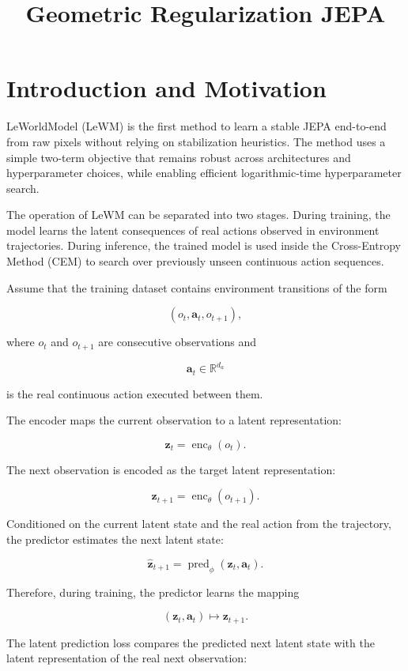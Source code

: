 ﻿\documentclass{article}
\title{Geometric Regularization JEPA}
\begin{document}
\maketitle

\section{Introduction and Motivation}

LeWorldModel (LeWM) is the first method to learn a stable JEPA
end-to-end from raw pixels without relying on stabilization heuristics.
The method uses a simple two-term objective that remains robust across
architectures and hyperparameter choices, while enabling efficient
logarithmic-time hyperparameter search.

The operation of LeWM can be separated into two stages. During training,
the model learns the latent consequences of real actions observed in
environment trajectories. During inference, the trained model is used
inside the Cross-Entropy Method (CEM) to search over previously unseen
continuous action sequences.


Assume that the training dataset contains environment transitions of the
form

\[
\left(
o_t,
\mathbf{a}_t,
o_{t+1}
\right),
\]

where \(o_t\) and \(o_{t+1}\) are consecutive observations and

\[
\mathbf{a}_t \in \mathbb{R}^{d_a}
\]

is the real continuous action executed between them.

The encoder maps the current observation to a latent representation:

\[
\mathbf{z}_t
=
\operatorname{enc}_{\theta}(o_t).
\]

The next observation is encoded as the target latent representation:

\[
\mathbf{z}_{t+1}
=
\operatorname{enc}_{\theta}(o_{t+1}).
\]

Conditioned on the current latent state and the real action from the
trajectory, the predictor estimates the next latent state:

\[
\hat{\mathbf{z}}_{t+1}
=
\operatorname{pred}_{\phi}
\left(
\mathbf{z}_t,
\mathbf{a}_t
\right).
\]

Therefore, during training, the predictor learns the mapping

\[
\left(
\mathbf{z}_t,
\mathbf{a}_t
\right)
\longmapsto
\mathbf{z}_{t+1}.
\]

The latent prediction loss compares the predicted next latent state with
the latent representation of the real next observation:
\end{document}
